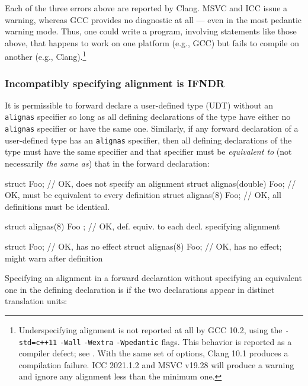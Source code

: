 \noindent Each of the three errors above are reported by Clang. MSVC and ICC issue a warning, whereas
 GCC
provides no diagnostic at all ---
even in the most pedantic warning mode. Thus, one could write a program,
involving statements like those above, that happens to work on one
platform (e.g., GCC) but fails to compile on another (e.g.,
Clang).{\cprotect\footnote{Underspecifying alignment is not reported at
all by GCC 10.2, using the
\lstinline!-std=c++11! \lstinline!-Wall! \lstinline!-Wextra! \mbox{\lstinline!-Wpedantic!}
flags. This behavior is reported as a compiler defect; see \cite{wakely15}. With the same set of options, Clang 10.1 produces a compilation
failure. ICC 2021.1.2 and MSVC v19.28 will produce a warning and ignore any alignment
  less than the minimum one.}}

\subsubsection[Incompatibly specifying alignment is IFNDR]{Incompatibly specifying alignment is IFNDR}\label{incompatibly-specifying-alignment-is-ifndr}

It is permissible to forward declare a user-defined type (UDT)
without an \lstinline!alignas! specifier so long as all defining
declarations of the type have either no \lstinline!alignas! specifier or
have the same one. Similarly, if any forward declaration of a
user-defined type has an \lstinline!alignas! specifier, then all defining
declarations of the type must have the same specifier and that specifier
must be \emph{equivalent to} (not necessarily \emph{the same as}) that
in the forward declaration:

\begin{emcppslisting}
struct Foo;                  // OK, does not specify an alignment
struct alignas(double) Foo;  // OK, must be equivalent to every definition
struct alignas(8) Foo;       // OK, all definitions must be identical.

struct alignas(8) Foo { };   // OK, def. equiv. to each decl. specifying alignment

struct Foo;                  // OK, has no effect
struct alignas(8) Foo;       // OK, has no effect; might warn after definition
\end{emcppslisting}

\noindent Specifying an alignment in a forward declaration without specifying an
equivalent one in the defining declaration is  if the two declarations appear in distinct translation
units:

